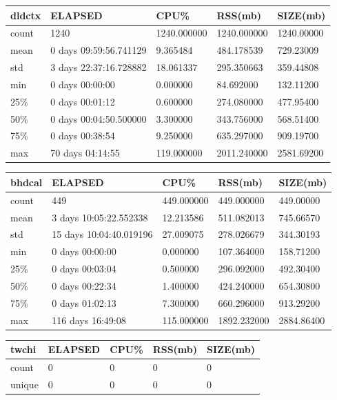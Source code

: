 \documentclass{article}
\begin{document}
\begin{tabular}{|l|l|l|l|l|}
\hline 
\hline dldctx& ELAPSED&    CPU\%&  RSS(mb)&   SIZE(mb) \\
\hline count&   1240& 1240.000000& 1240.000000& 1240.00000 \\
\hline mean&  0 days 09:59:56.741129&   9.365484&  484.178539&  729.23009 \\
\hline std&  3 days 22:37:16.728882&  18.061337&  295.350663&  359.44808 \\
\hline min&   0 days 00:00:00&   0.000000&  84.692000&  132.11200 \\
\hline 25\%&   0 days 00:01:12&   0.600000&  274.080000&  477.95400 \\
\hline 50\%&  0 days 00:04:50.500000&   3.300000&  343.756000&  568.51400 \\
\hline 75\%&   0 days 00:38:54&   9.250000&  635.297000&  909.19700 \\
\hline max&  70 days 04:14:55&  119.000000& 2011.240000& 2581.69200 \\
\hline 
\end{tabular}
 
\begin{tabular}{|l|l|l|l|l|}
\hline 
\hline bhdcal&    ELAPSED&   CPU\%&  RSS(mb)&   SIZE(mb) \\
\hline count&   449& 449.000000&  449.000000&  449.00000 \\
\hline mean&  3 days 10:05:22.552338&  12.213586&  511.082013&  745.66570 \\
\hline std&  15 days 10:04:40.019196&  27.009075&  278.026679&  344.30193 \\
\hline min&   0 days 00:00:00&  0.000000&  107.364000&  158.71200 \\
\hline 25\%&   0 days 00:03:04&  0.500000&  296.092000&  492.30400 \\
\hline 50\%&   0 days 00:22:34&  1.400000&  424.240000&  654.30800 \\
\hline 75\%&   0 days 01:02:13&  7.300000&  660.296000&  913.29200 \\
\hline max&  116 days 16:49:08& 115.000000& 1892.232000& 2884.86400 \\
\hline 
\end{tabular}
 
\begin{tabular}{|l|l|l|l|l|}
\hline 
\hline twchi& ELAPSED& CPU\%& RSS(mb)& SIZE(mb) \\
\hline count&    0&   0&   0& 0    \\
\hline unique&   0&   0&   0& 0    \\
\hline 
\end{tabular}
 
\end{document}
